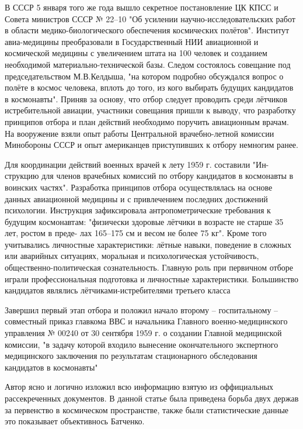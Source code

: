 В СССР 5 января того же года вышло секретное постановление ЦК КПСС
и Совета министров СССР № 22–10 "Об усилении научно-­исследовательских
работ в области медико-­биологического обеспечения космических полётов".
Институт авиа-медицины преобразовали в Государственный НИИ авиационной и космической медицины с увеличением штата на 100 человек и созданием необходимой
материально-­технической базы.
Следом состоялось совещание под председательством М.В.Келдыша, "на котором подробно обсуждался вопрос о полёте в космос человека, вплоть до того, из кого выбирать будущих кандидатов в космонавты". Приняв за основу, что отбор следует
проводить среди лётчиков истребительной авиации, участники совещания пришли к выводу, что разработку принципов отбора и план действий необходимо
поручить авиационным врачам. На вооружение взяли опыт работы Центральной врачебно-летной комиссии Минобороны СССР и опыт американцев приступивших к отбору немногим ранее.


Для координации действий военных врачей к лету 1959 г. составили "Ин-
струкцию для членов врачебных комиссий по отбору кандидатов в космонавты
в воинских частях". Разработка принципов отбора осуществлялась на основе данных авиационной
медицины и с привлечением последних достижений психологии.
Инструкция зафиксировала антропометрические требования к будущим космонавтам:
"физически здоровые лётчики в возрасте не старше 35 лет, ростом в преде-
лах 165–175 см и весом не более 75 кг". Кроме того учитывались личностные характеристики:
лётные навыки, поведение в сложных или аварийных ситуациях, моральная
и психологическая устойчивость, общественно-­политическая сознательность.
Главную роль при первичном отборе играли профессиональная подготовка
и личностные характеристики. Большинство кандидатов являлись лётчиками-­истребителями третьего класса


Завершил первый этап отбора и положил начало второму – госпитальному – совместный приказ главкома ВВС и начальника Главного военно-­медицинского управления № 00240 от 30 сентября 1959 г. о создании Главной
медицинской комиссии, "в задачу которой входило вынесение окончательного
экспертного медицинского заключения по результатам стационарного обследования кандидатов в космонавты"

Автор ясно и логично изложил всю информацию взятую из оффициальных рассекреченных документов.
В данной статье была приведена борьба двух держав за первенство в космическом пространстве, также были статистические данные
это показывает объективнось Батченко.


